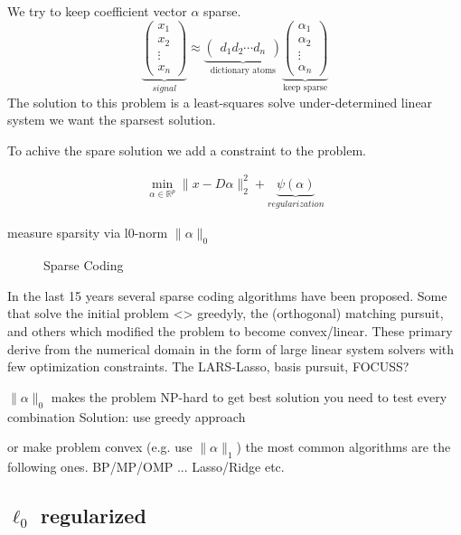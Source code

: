 We try to keep coefficient vector $\alpha$ sparse. 
\[
\underbrace{\begin{pmatrix} x_1 \\ x_2 \\ \vdots \\ x_n \end{pmatrix}}_{signal} \approx \underbrace{\begin{pmatrix} d_1  d_2 \cdots d_n \end{pmatrix}}_{\textrm{dictionary atoms}}
\underbrace{\begin{pmatrix} \alpha_1 \\ \alpha_2 \\ \vdots \\ \alpha_n \end{pmatrix}}_{\textrm{keep sparse}}
\]
The solution to this problem is a least-squares solve under-determined linear system we want the sparsest solution.

To achive the spare solution we add a constraint to the problem. 

\begin{align}
\min_{\alpha\in\mathbb{R}^{p}} \lVert x - D\alpha \rVert^{2}_{2} + \underbrace{\psi(\alpha)}_{regularization}
\end{align}


measure sparsity via       l0-norm       $\lVert\alpha\rVert_{0}$

\begin{figure}
\centering
\caption{Sparse Coding}
\label{fig:da_x}
\end{figure}


In the last 15 years several sparse coding algorithms have been proposed. 
Some that solve the initial problem <> greedyly, the (orthogonal) matching pursuit, and others which modified the problem to become convex/linear. These primary derive from the numerical domain in the form of 
large linear system solvers with few optimization constraints. The LARS-Lasso, basis pursuit, FOCUSS?


$\lVert\alpha\rVert_{0}$ makes the problem NP-hard
to get best solution you need to test every combination
Solution:
use greedy approach 

or make problem convex (e.g. use $\lVert\alpha\rVert_{1}$)
the most common algorithms are the following ones.
BP/MP/OMP ...
Lasso/Ridge etc.



\subsection {$\ell_0$ regularized}

